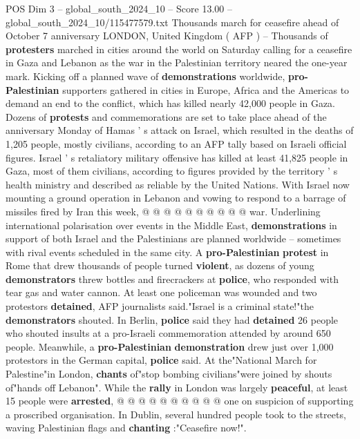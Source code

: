 \begin{textsample}{POS Dim 3 – global\_south\_2024\_10 – Score 13.00 – global\_south\_2024\_10/115477579.txt}  \label{ex:f3_pos_358}
Thousands march for ceasefire ahead of October 7 anniversary LONDON, United Kingdom ( AFP ) -- Thousands of \textbf{protesters} marched in cities around the world on Saturday calling for a ceasefire in Gaza and Lebanon as the war in the Palestinian territory neared the one-year mark.
Kicking off a planned wave of \textbf{demonstrations} worldwide, \textbf{pro-Palestinian} supporters gathered in cities in Europe, Africa and the Americas to demand an end to the conflict, which has killed nearly 42,000 people in Gaza.
Dozens of \textbf{protests} and commemorations are set to take place ahead of the anniversary Monday of Hamas ' s attack on Israel, which resulted in the deaths of 1,205 people, mostly civilians, according to an AFP tally based on Israeli official figures.
Israel ' s retaliatory military offensive has killed at least 41,825 people in Gaza, most of them civilians, according to figures provided by the territory ' s health ministry and described as reliable by the United Nations.
With Israel now mounting a ground operation in Lebanon and vowing to respond to a barrage of missiles fired by Iran this week, @ @ @ @ @ @ @ @ @ @ war.
Underlining international polarisation over events in the Middle East, \textbf{demonstrations} in support of both Israel and the Palestinians are planned worldwide -- sometimes with rival events scheduled in the same city.
A \textbf{pro-Palestinian} \textbf{protest} in Rome that drew thousands of people turned \textbf{violent}, as dozens of young \textbf{demonstrators} threw bottles and firecrackers at \textbf{police}, who responded with tear gas and water cannon.
At least one policeman was wounded and two protestors \textbf{detained}, AFP journalists said."Israel is a criminal state!"the \textbf{demonstrators} shouted.
In Berlin, \textbf{police} said they had \textbf{detained} 26 people who shouted insults at a pro-Israeli commemoration attended by around 650 people.
Meanwhile, a \textbf{pro-Palestinian} \textbf{demonstration} drew just over 1,000 protestors in the German capital, \textbf{police} said.
At the"National March for Palestine"in London, \textbf{chants} of"stop bombing civilians"were joined by shouts of"hands off Lebanon".
While the \textbf{rally} in London was largely \textbf{peaceful}, at least 15 people were \textbf{arrested}, @ @ @ @ @ @ @ @ @ @ one on suspicion of supporting a proscribed organisation.
In Dublin, several hundred people took to the streets, waving Palestinian flags and \textbf{chanting} :"Ceasefire now!".

\end{textsample}
